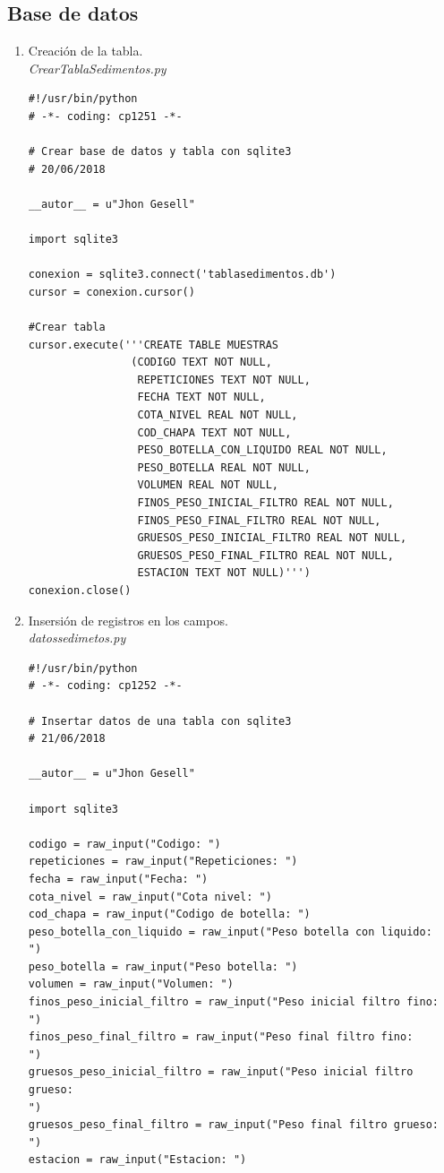 \documentclass[a4paper,openright,12pt]{report}
\begin{document}
\subsection{Base de datos}
\begin{enumerate}
\item Creaci\'on de la tabla. \\
\textit{CrearTablaSedimentos.py}
\begin{lstlisting}
#!/usr/bin/python
# -*- coding: cp1251 -*-

# Crear base de datos y tabla con sqlite3
# 20/06/2018

__autor__ = u"Jhon Gesell"

import sqlite3

conexion = sqlite3.connect('tablasedimentos.db')
cursor = conexion.cursor()

#Crear tabla
cursor.execute('''CREATE TABLE MUESTRAS
                (CODIGO TEXT NOT NULL,
                 REPETICIONES TEXT NOT NULL,
                 FECHA TEXT NOT NULL,
                 COTA_NIVEL REAL NOT NULL,
                 COD_CHAPA TEXT NOT NULL,
                 PESO_BOTELLA_CON_LIQUIDO REAL NOT NULL,
                 PESO_BOTELLA REAL NOT NULL,
                 VOLUMEN REAL NOT NULL,
                 FINOS_PESO_INICIAL_FILTRO REAL NOT NULL,
                 FINOS_PESO_FINAL_FILTRO REAL NOT NULL,
                 GRUESOS_PESO_INICIAL_FILTRO REAL NOT NULL,
                 GRUESOS_PESO_FINAL_FILTRO REAL NOT NULL,
                 ESTACION TEXT NOT NULL)''')
conexion.close()

\end{lstlisting}

\item Insersi\'on de registros en los campos. \\
\textit{datossedimetos.py}
\begin{lstlisting}
#!/usr/bin/python
# -*- coding: cp1252 -*-

# Insertar datos de una tabla con sqlite3
# 21/06/2018

__autor__ = u"Jhon Gesell"

import sqlite3

codigo = raw_input("Codigo: ")
repeticiones = raw_input("Repeticiones: ")
fecha = raw_input("Fecha: ")
cota_nivel = raw_input("Cota nivel: ")
cod_chapa = raw_input("Codigo de botella: ")
peso_botella_con_liquido = raw_input("Peso botella con liquido:
")
peso_botella = raw_input("Peso botella: ")
volumen = raw_input("Volumen: ")
finos_peso_inicial_filtro = raw_input("Peso inicial filtro fino:
")
finos_peso_final_filtro = raw_input("Peso final filtro fino:
")
gruesos_peso_inicial_filtro = raw_input("Peso inicial filtro
grueso:
")
gruesos_peso_final_filtro = raw_input("Peso final filtro grueso:
")
estacion = raw_input("Estacion: ")


\end{lstlisting}
\end{enumerate}
\end{document}
